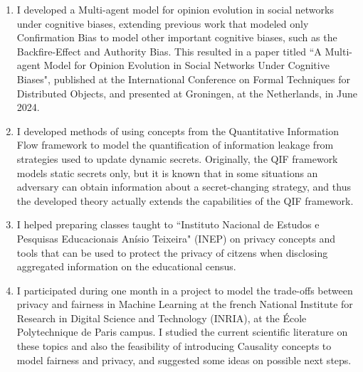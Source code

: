 \documentclass[12pt]{article}
\newcommand{\qm}[1]{``#1"}
\begin{document}
\begin{enumerate}
\item I developed a Multi-agent model for opinion evolution in social networks under cognitive biases, extending previous work that modeled only Confirmation Bias to model other important cognitive biases, such as the Backfire-Effect and Authority Bias. This resulted in a paper titled \qm{A Multi-agent Model for Opinion Evolution in Social Networks Under Cognitive Biases}, published at the International Conference on Formal Techniques for Distributed Objects, and presented at Groningen, at the Netherlands, in June 2024.
\item I developed methods of using concepts from the Quantitative Information Flow framework to model the quantification of information leakage from strategies used to update dynamic secrets. Originally, the QIF framework models static secrets only, but it is known that in some situations an adversary can obtain information about a secret-changing strategy, and thus the developed theory actually extends the capabilities of the QIF framework.
\item I helped preparing classes taught to \qm{Instituto Nacional de Estudos e Pesquisas Educacionais Anísio Teixeira} (INEP) on privacy concepts and tools that can be used to protect the privacy of citzens when disclosing aggregated information on the educational census.
\item I participated during one month in a project to model the trade-offs between privacy and fairness in Machine Learning at the french National Institute for Research in Digital Science and Technology (INRIA), at the École Polytechnique de Paris campus. I studied the current scientific literature on these topics and also the feasibility of introducing Causality concepts to model fairness and privacy, and suggested some ideas on possible next steps.
\end{enumerate}
\end{document}
